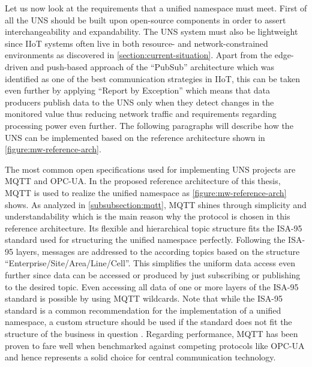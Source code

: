     Let us now look at the requirements that a unified namespace must meet. First of all the UNS should be built upon open-source components in order to assert interchangeability and expandability. The UNS system must also be lightweight since IIoT systems often live in both resource- and network-constrained environments as discovered in \autoref{section:current-situation}. Apart from the edge-driven and push-based approach of the ``PubSub'' architecture which was identified as one of the best communication strategies in IIoT, this can be taken even further by applying ``Report by Exception'' which means that data producers publish data to the UNS only when they detect changes in the monitored value thus reducing network traffic and requirements regarding processing power even further. The following paragraphs will describe how the UNS can be implemented based on the reference architecture shown in \autoref{figure:mw-reference-arch}.\newline

    The most common open specifications used for implementing UNS projects are MQTT and OPC-UA. In the proposed reference architecture of this thesis, MQTT is used to realize the unified namespace as \autoref{figure:mw-reference-arch} shows. As analyzed in \autoref{subsubsection:mqtt}, MQTT shines through simplicity and understandability which is the main reason why the protocol is chosen in this reference architecture. Its flexible and hierarchical topic structure fits the ISA-95 standard used for structuring the unified namespace perfectly. Following the ISA-95 layers, messages are addressed to the according topics based on the structure ``Enterprise/Site/Area/Line/Cell''. This simplifies the uniform data access even further since data can be accessed or produced by just subscribing or publishing to the desired topic. Even accessing all data of one or more layers of the ISA-95 standard is possible by using MQTT wildcards. Note that while the ISA-95 standard is a common recommendation for the implementation of a unified namespace, a custom structure should be used if the standard does not fit the structure of the business in question \cite{hivemq_essentials_uns}. Regarding performance, MQTT has been proven to fare well when benchmarked against competing protocols like OPC-UA \cite{does_mqtt_uns_solve} and hence represents a solid choice for central communication technology. \newline
    
